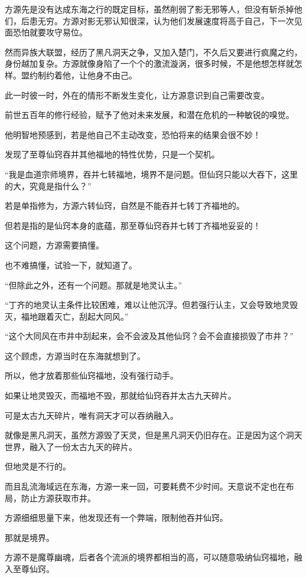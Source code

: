 \begin{this_body}
方源先是没有达成东海之行的既定目标，虽然削弱了影无邪等人，但没有斩杀掉他们，后患无穷。方源对影无邪认知很深，认为他们发展速度将高于自己，下一次见面恐怕就要攻守易位。

然而异族大联盟，经历了黑凡洞天之争，又加入楚门，不久后又要进行疯魔之约，身份越加复杂。方源就像身陷了一个个的激流漩涡，很多时候，不是他想怎样就怎样。盟约制约着他，让他身不由己。

此一时彼一时，外在的情形不断发生变化，让方源意识到自己需要改变。

前世五百年的修行经验，赋予了他对未来发展，和潜在危机的一种敏锐的嗅觉。

他明智地预感到，若是他自己不主动改变，恐怕将来的结果会很不妙！

发现了至尊仙窍吞并其他福地的特性优势，只是一个契机。

“我是血道宗师境界，吞并七转福地，境界不是问题。但仙窍只能以大吞下，这里的大，究竟是指什么？”

若是单指修为，方源六转仙窍，自然是不能吞并七转丁齐福地的。

但若是指的是仙窍本身的底蕴，那至尊仙窍吞并七转丁齐福地妥妥的！

这个问题，方源需要搞懂。

也不难搞懂，试验一下，就知道了。

“但除此之外，还有一个问题。那就是地灵认主。”

“丁齐的地灵认主条件比较困难，难以让他沉浮。但若强行认主，又会导致地灵毁灭，福地跟着灭亡，刮起大同风。”

“这个大同风在市井中刮起来，会不会波及其他仙窍？会不会直接损毁了市井？”

这个顾虑，方源当时在东海就想到了。

所以，他才放着那些仙窍福地，没有强行动手。

如果让地灵毁灭，而福地不毁，那就给仙窍吞并太古九天碎片。

可是太古九天碎片，唯有洞天才可以吞纳融入。

就像是黑凡洞天，虽然方源毁了天灵，但是黑凡洞天仍旧存在。正是因为这个洞天世界，融入了一份太古九天的碎片。

但地灵是不行的。

而且乱流海域远在东海，方源一来一回，可要耗费不少时间。天意说不定也在布局，防止方源获取市井。

方源细细思量下来，他发现还有一个弊端，限制他吞并仙窍。

那就是境界。

方源不是魔尊幽魂，后者各个流派的境界都相当的高，可以随意吸纳仙窍福地，融入至尊仙窍。


\end{this_body}
